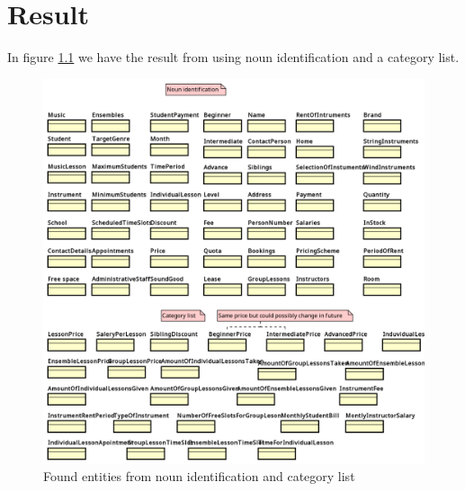 \documentclass[a4paper]{scrreprt}
\begin{document}
\chapter{Result}
\label{sec:result}
In figure \ref{fig:nounCategoryList} we have the result from using noun identification and a category list.

\begin{figure}[h]
    \begin{center}
        \includegraphics[width=.8\textwidth]{../img/noun-and-category.png}
        \caption{Found entities from noun identification and category list}
        \label{fig:nounCategoryList}
    \end{center}
\end{figure}
\end{document}
